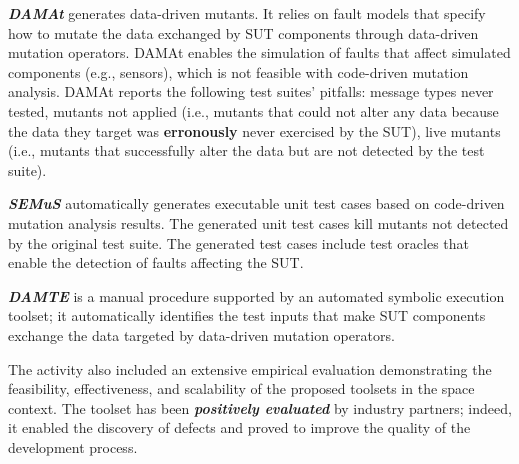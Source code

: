 \documentclass[a4paper]{report}
\begin{document}
\textbf{\emph{DAMAt}} generates data-driven mutants. 
It relies on fault models that specify how to mutate the data exchanged by SUT components through data-driven mutation operators. 
DAMAt enables the simulation of faults that affect simulated components (e.g., sensors), which is not feasible with code-driven mutation analysis. 
DAMAt reports the following test suites' pitfalls: message types never tested,
mutants not applied (i.e., mutants that could not alter any data because the data they target was \textbf{erronously} never exercised by the SUT),
live mutants (i.e., mutants that successfully alter the data but are not detected by the test suite).

\textbf{\emph{SEMuS}} automatically generates executable unit test cases based on code-driven mutation analysis results. The generated unit test cases kill mutants not detected by the original test suite. The generated test cases include test oracles that enable the detection of faults affecting the SUT.


\textbf{\emph{DAMTE}} is a manual procedure supported by an automated symbolic execution toolset; it automatically identifies the test inputs that make SUT components exchange the data targeted by data-driven mutation operators. 
 
The activity also included an extensive empirical evaluation demonstrating the feasibility, effectiveness, and scalability of the proposed toolsets in the space context. The toolset has been \textbf{\emph{positively evaluated}} by industry partners; indeed, it enabled the discovery of defects and proved to improve the quality of the development process.
\end{document}
